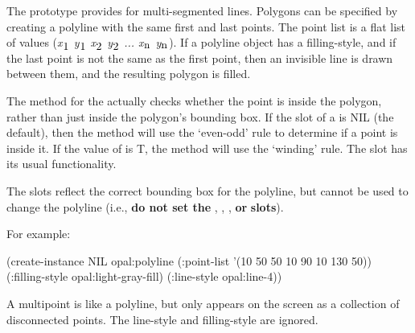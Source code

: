 The  prototype provides for multi-segmented lines.  Polygons
can be specified by creating a polyline with the same first and last points.
The point list is a flat list of values ({\it x$_{\hbox{1}}$ y$_{\hbox{1}}$ x$_{\hbox{2}}$ y$_{\hbox{2}}$ ...
x$_{\hbox{n}}$ y$_{\hbox{n}}$}).  If a polyline object has a filling-style, and if the last
point is not the same as the first point, then an invisible
line is drawn between them, and the resulting polygon is filled.

The  method for the 
actually checks whether the point is inside the polygon, rather than just
inside the polygon's bounding box.  If the  slot
of a  is NIL (the default), then the  method
will use the `even-odd' rule to determine if a point is inside it.  If the
value of  is T, the method will use the `winding'
rule.  The slot  has its usual functionality.

The  slots reflect the correct bounding box for the
polyline, but cannot be used to change the polyline (i.e., {\bf do not
set the} , , , {\bf or}  {\bf slots}).

\vspace{1 line}
\begin{group}
For example:
\begin{programexample}
\begin{center}
\end{center}
(create-instance NIL opal:polyline
   (:point-list '(10 50 50 10 90 10 130 50))
   (:filling-style opal:light-gray-fill)
   (:line-style opal:line-4))
\end{programexample}
\end{group}

A multipoint is like a polyline, but only appears on the screen as
a collection of disconnected points.  The line-style and filling-style
are ignored.



